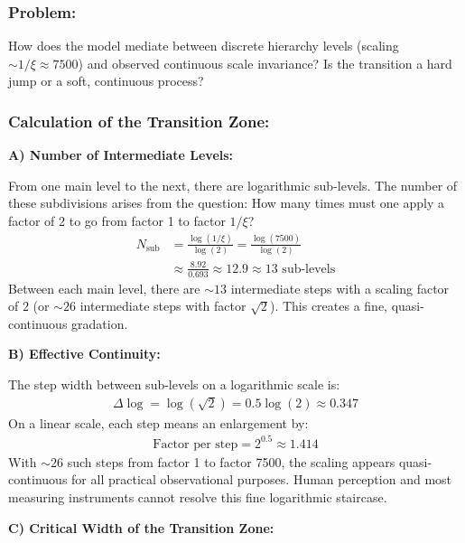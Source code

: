 	\subsubsection*{Problem:}
	How does the model mediate between discrete hierarchy levels (scaling $\sim 1/\xi \approx 7500$) and observed continuous scale invariance? Is the transition a hard jump or a soft, continuous process?
	
	\subsubsection*{Calculation of the Transition Zone:}
	
	\textbf{A) Number of Intermediate Levels:}
	
	From one main level to the next, there are logarithmic sub-levels. The number of these subdivisions arises from the question: How many times must one apply a factor of 2 to go from factor 1 to factor $1/\xi$?
	\begin{align*}
		N_{\text{sub}} &= \frac{\log(1/\xi)}{\log(2)} = \frac{\log(7500)}{\log(2)} \\
		&\approx \frac{8.92}{0.693} \approx 12.9 \approx 13 \text{ sub-levels}
	\end{align*}
	Between each main level, there are $\sim 13$ intermediate steps with a scaling factor of $2$ (or $\sim 26$ intermediate steps with factor $\sqrt{2}$). This creates a fine, quasi-continuous gradation.
	
	\textbf{B) Effective Continuity:}
	
	The step width between sub-levels on a logarithmic scale is:
	\begin{align*}
		\Delta \log = \log(\sqrt{2}) = 0.5 \log(2) \approx 0.347
	\end{align*}
	On a linear scale, each step means an enlargement by:
	\begin{align*}
		\text{Factor per step} = 2^{0.5} \approx 1.414
	\end{align*}
	With $\sim 26$ such steps from factor 1 to factor 7500, the scaling appears quasi-continuous for all practical observational purposes. Human perception and most measuring instruments cannot resolve this fine logarithmic staircase.
	
	\textbf{C) Critical Width of the Transition Zone:}
	
